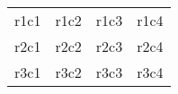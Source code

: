 \begin{tabular}{llll}
  r1c1 & r1c2 & r1c3 & r1c4\\
  r2c1 & r2c2 & r2c3 & r2c4\\
  r3c1 & r3c2 & r3c3 & r3c4\\
\end{tabular}
